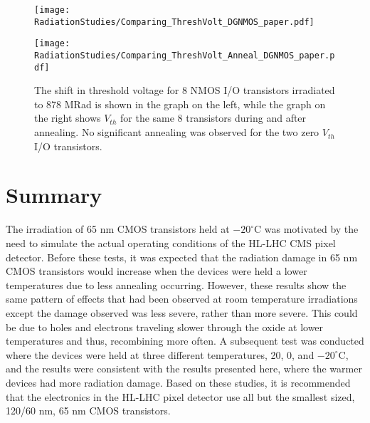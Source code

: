 \begin{figure}[h!]
\begin{minipage}[b]{0.5\textwidth}
	\centering
	\texttt{[image: RadiationStudies/Comparing\_ThreshVolt\_DGNMOS\_paper.pdf]}
\end{minipage}
\hspace{0.5cm}
\begin{minipage}[b]{0.5\textwidth}
	\centering
	\texttt{[image: RadiationStudies/Comparing\_ThreshVolt\_Anneal\_DGNMOS\_paper.pdf]}
\end{minipage}
\caption{The shift in threshold voltage for 8 NMOS I/O transistors irradiated to 878 MRad is shown in the graph on the left, while the graph on the right shows $V_{th}$ for the same 8 transistors during and after annealing.  No significant annealing was observed for the two zero $V_{th}$ I/O transistors.}
\label{fig:DGNMOS_Vth}
\end{figure}

\section{Summary}

The irradiation of 65 nm CMOS transistors held at $-20^{\circ}\mathrm{C}$ was motivated by the need to simulate the actual operating conditions of the HL-LHC CMS pixel detector. Before these tests, it was expected that the radiation damage in 65 nm CMOS transistors would increase when the devices were held a lower temperatures due to less annealing occurring. However, these results show the same pattern of effects that had been observed at room temperature irradiations except the damage observed was less severe, rather than more severe. This could be due to holes and electrons traveling slower through the oxide at lower temperatures and thus, recombining more often\cite{RINCE}. A subsequent test was conducted where the devices were held at three different temperatures, 20, 0, and $-20^{\circ}\mathrm{C}$, and the results were consistent with the results presented here, where the warmer devices had more radiation damage. Based on these studies, it is recommended that the electronics in the HL-LHC pixel detector use all but the smallest sized, 120/60 nm, 65 nm CMOS transistors.

















